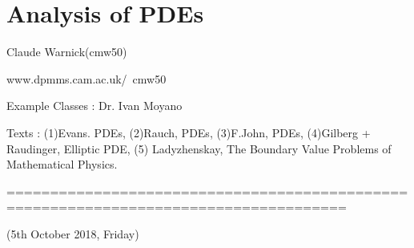 \documentclass[10pt,a4paper]{report}
\begin{document}
\newcommand{\thm}{\textbf{Theorem) }}
\newcommand{\thmnum}[1]{\textbf{Theorem #1) }}
\newcommand{\defi}{\textbf{Definition) }}
\newcommand{\definum}[1]{\textbf{Definition #1) }}
\newcommand{\lem}{\textbf{Lemma) }}
\newcommand{\lemnum}[1]{\textbf{Lemma #1) }}
\newcommand{\prop}{\textbf{Proposition) }}
\newcommand{\propnum}[1]{\textbf{Proposition #1) }}
\newcommand{\corr}{\textbf{Corollary) }}
\newcommand{\corrnum}[1]{\textbf{Corollary #1) }}
\newcommand{\pf}{\textbf{proof) }}


\newcommand{\lap}{\triangle} %
\newcommand{\s}{\vspace{10pt}}
\newcommand{\bull}{$\bullet$}
\newcommand{\sta}{$\star$}
\newcommand{\reals}{\mathbb{R}}

\newcommand{\eop}{\hfill  \textsl{(End of proof)} $\square$} %
\newcommand{\eos}{\hfill  \textsl{(End of statement)} $\square$} %


\newcommand{\intN}{\mathbb{Z}_N}
\newcommand{\nat}{\mathbb{N}}
\newcommand{\norms}[2]{\parallel #1 \parallel_{#2}}
\newcommand{\abs}[1]{\big| #1 \big|}
\newcommand{\avg}{\mathbb{E}}
\newcommand{\prob}{\mathbb{P}}
\newcommand{\borel}{\mathscr{B}}
\newcommand{\EE}{\mathscr{E}}
\newcommand{\pa}{\partial}

\renewcommand{\bar}{\overline}

\def\doubleunderline#1{\underline{\underline{#1}}}

\newcommand{\newday}{===============================================================}
\newcommand{\digression}{**********************************************************************************************}


\setlength\parindent{0pt}

\chapter*{Analysis of PDEs}
\s

Claude Warnick(cmw50)

www.dpmms.cam.ac.uk/~cmw50

Example Classes : Dr. Ivan Moyano
\s

Texts : (1)Evans. PDEs, (2)Rauch, PDEs, (3)F.John, PDEs, (4)Gilberg + Raudinger, Elliptic PDE, (5) Ladyzhenskay, The Boundary Value Problems of Mathematical Physics.
\s

=====================================================================================

(5th October 2018, Friday)
\s
\end{document}
